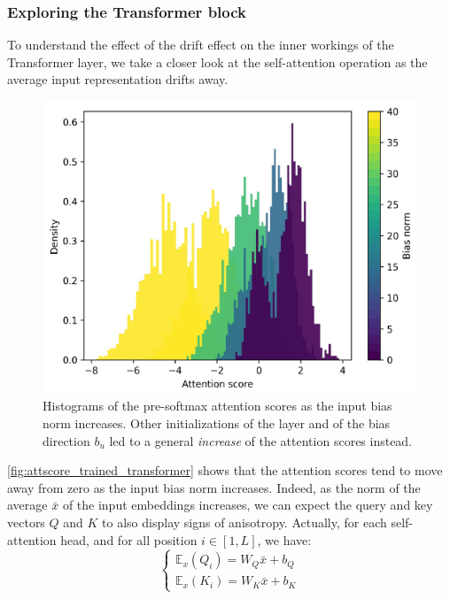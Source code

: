 \subsubsection{Exploring the Transformer block}

To understand the effect of the drift effect on the inner workings of the Transformer layer, we take a closer look at the self-attention operation as the average input representation drifts away.

\begin{figure}[ht]
    \centering
    \includegraphics[width=0.9\linewidth]{sources/part_1/anisotropy/imgs/trained_bert_base_att_scores.pdf}
    \caption{Histograms of the pre-softmax attention scores as the input bias norm increases. Other initializations of the layer and of the bias direction $b_u$ led to a general \textit{increase} of the attention scores instead.}
    \label{fig:attscore_trained_transformer}
\end{figure}

\autoref{fig:attscore_trained_transformer} shows that the attention scores tend to move away from zero as the input bias norm increases. Indeed, as the norm of the average $\bar{x}$ of the input embeddings increases, we can expect the query and key vectors $Q$ and $K$ to also display signs of anisotropy. Actually, for each self-attention head, and for all position $i \in [1, L]$, we have:
\begin{equation}
    \begin{cases}
      \mathbb{E}_x(Q_i) = W_Q\bar{x} + b_Q\\
      \mathbb{E}_x(K_i) = W_K\bar{x} + b_K
    \end{cases}
\end{equation}

